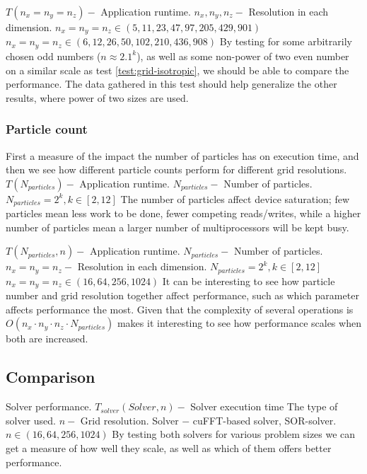 	{$T(n_x = n_y = n_z) -$ Application runtime.}
	{$n_x, n_y, n_z -$ Resolution in each dimension.}
	{$n_x=n_y=n_z \in (5, 11, 23, 47, 97, 205, 429, 901)$
	  $n_x=n_y=n_z \in (6, 12, 26, 50, 102, 210, 436, 908)$}
	{By testing for some arbitrarily chosen odd numbers ($n\approx 2.1^k$), as well as some non-power of two even number on
	a similar scale as test \ref{test:grid-isotropic}, we should be able to compare the performance. The data gathered in this test
	should help generalize the other results, where power of two sizes are used.}

\subsubsection{Particle count}
First a measure of the impact the number of particles has on execution time, and then we see how different particle
counts perform for different grid resolutions.
	{$T(N_{particles}) -$ Application runtime.}
	{$N_{particles} -$ Number of particles.}
	{$N_{particles} = 2^k, k\in [2, 12]$}
	{The number of particles affect device saturation; few particles mean less work to be done, fewer competing reads/writes,
	  while a higher number of particles mean a larger number of multiprocessors will be kept busy.}

	{$T(N_{particles}, n) -$ Application runtime.}
	{$N_{particles} -$ Number of particles.\newline
	  $n_x = n_y = n_z -$ Resolution in each dimension.}
	{$N_{particles} = 2^k, k\in [2, 12]$\newline
	  $n_x = n_y = n_z \in (16, 64, 256, 1024)$}
	{It can be interesting to see how particle number and grid resolution together affect performance, such as which
	  parameter affects performance the most. Given that the complexity of several operations is $O(n_x\cdot n_y \cdot n_z \cdot N_{particles})$
	  makes it interesting to see how performance scales when both are increased.}

\subsection{Comparison}
Solver performance.
	{$T_{solver}(Solver, n) -$ Solver execution time}
	{The type of solver used.\newline
	  $n -$ Grid resolution.}
	{Solver $-$ cuFFT-based solver, SOR-solver.\newline
	  $n \in(16, 64, 256, 1024)$}
	{By testing both solvers for various problem sizes we can get a measure of how well they scale, as well as which of them
	  offers better performance.}
	  
